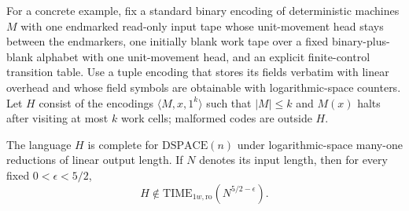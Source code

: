 For a concrete example, fix a standard binary encoding of deterministic
machines \(M\) with one endmarked read-only input tape whose unit-movement
head stays between the endmarkers, one initially blank work tape over a
fixed binary-plus-blank alphabet with one unit-movement head, and an
explicit finite-control transition
table. Use a tuple encoding that stores its
fields verbatim with linear overhead and whose field symbols are
obtainable with logarithmic-space counters. Let \(H\) consist of the
encodings \(\langle M,x,1^k\rangle\)
such that \(|M|\le k\) and \(M(x)\) halts after visiting at most \(k\)
work cells; malformed codes are outside \(H\).

\begin{corollary}
\label{cor:bounded-space-halting}
The language \(H\) is complete for \(\mathrm{DSPACE}(n)\) under
logarithmic-space many-one reductions of linear output length.
If \(N\) denotes its input length, then for every fixed
\(0<\epsilon<5/2\),
\[
 H\notin
 \mathrm{TIME}_{1w,\mathrm{ro}}\!\left(N^{5/2-\epsilon}\right).
\]
\end{corollary}

